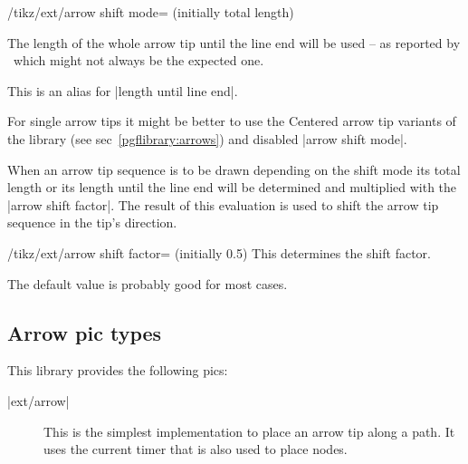 \begin{multicols}{2}
\begin{key}{/tikz/ext/arrow shift mode= (initially total length)}
\begin{description}
  The length of the whole arrow tip until the line end will be used --
  as reported by \pgfname\ which might not always be the expected one.
\item[|arrow shift mode|=\declare{|line end|}]

  This is an alias for |length until line end|.
\end{description}
\begin{codeexample}[preamble=\usetikzlibrary{ext.arrows-plus}]
\end{codeexample}

For single arrow tips it might be better to use the Centered arrow tip variants
of the  library (see sec~\ref{pgflibrary:arrows})
and disabled |arrow shift mode|.
\end{key}

When an arrow tip sequence is to be drawn depending on the shift mode
its total length or its length until the line end will be determined
and multiplied with the |arrow shift factor|.
The result of this evaluation is used to shift the arrow tip sequence
in the tip's direction.

\begin{key}{/tikz/ext/arrow shift factor= (initially 0.5)}
  This determines the shift factor.
  
  The default value is probably good for most cases.
\end{key}

\subsection{Arrow pic types}

This library provides the following pics:
\begin{description}
\item[|ext/arrow|]
  This is the simplest implementation to place an arrow tip along a path.
  It uses the current timer that is also used to place nodes.
  

\end{description}
\end{multicols}
